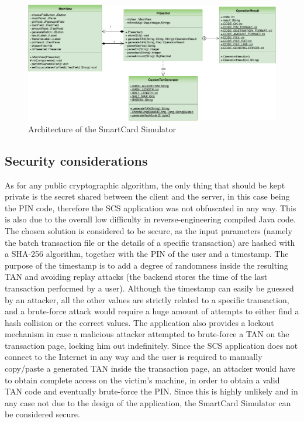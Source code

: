 \begin{figure}[h!tbp]
	\centering
	\includegraphics[width=\textwidth]{figures/scs_uml.png}
	\caption{Architecture of the SmartCard Simulator}
	\label{figure:scs_uml}
\end{figure}


\subsection{Security considerations}
As for any public cryptographic algorithm, the only thing that should be kept private is the secret shared between the client and the server, in this case being the PIN code, therefore the SCS application was not obfuscated in any way. This is also due to the overall low difficulty in reverse-engineering compiled Java code.\newline
The chosen solution is considered to be secure, as the input parameters (namely the batch transaction file or the details of a specific transaction) are hashed with a SHA-256 algorithm, together with the PIN of the user and a timestamp. 
The purpose of the timestamp is to add a degree of randomness inside the resulting TAN and avoiding replay attacks (the backend stores the time of the last transaction performed by a user). Although the timestamp can easily be guessed by an attacker, all the other values are strictly related to a specific transaction, and a brute-force attack would require a huge amount of attempts to either find a hash collision or the correct values. The \gnb{} application also provides a lockout mechanism in case a malicious attacker attempted to brute-force a TAN on the transaction page, locking him out indefinitely.\newline
Since the SCS application does not connect to the Internet in any way and the user is required to manually copy/paste a generated TAN inside the transaction page, an attacker would have to obtain complete access on the victim's machine, in order to obtain a valid TAN code and eventually brute-force the PIN. Since this is highly unlikely and in any case not due to the design of the application, the SmartCard Simulator can be considered secure.